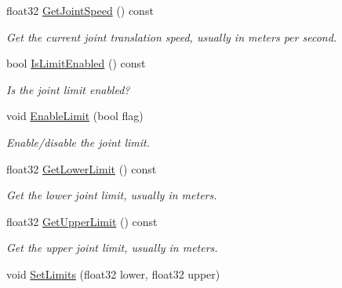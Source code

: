 \begin{DoxyCompactItemize}
float32 \hyperlink{classb2PrismaticJoint_af407d14ac024abdee49b852613f1bbc2}{Get\+Joint\+Speed} () const
\begin{DoxyCompactList}\small\item\em Get the current joint translation speed, usually in meters per second. \end{DoxyCompactList}\item 
\mbox{\label{classb2PrismaticJoint_a22e2442a17832f718447c63c9c6263c8}} 
bool \hyperlink{classb2PrismaticJoint_a22e2442a17832f718447c63c9c6263c8}{Is\+Limit\+Enabled} () const
\begin{DoxyCompactList}\small\item\em Is the joint limit enabled? \end{DoxyCompactList}\item 
\mbox{\label{classb2PrismaticJoint_a6d419afe7bd4b0e36d2e4607df7f79f2}} 
void \hyperlink{classb2PrismaticJoint_a6d419afe7bd4b0e36d2e4607df7f79f2}{Enable\+Limit} (bool flag)
\begin{DoxyCompactList}\small\item\em Enable/disable the joint limit. \end{DoxyCompactList}\item 
\mbox{\label{classb2PrismaticJoint_a10a2d3c03164190d279fa3c72eafb49e}} 
float32 \hyperlink{classb2PrismaticJoint_a10a2d3c03164190d279fa3c72eafb49e}{Get\+Lower\+Limit} () const
\begin{DoxyCompactList}\small\item\em Get the lower joint limit, usually in meters. \end{DoxyCompactList}\item 
\mbox{\label{classb2PrismaticJoint_aabae1da55e500b9c77007de4d085ffda}} 
float32 \hyperlink{classb2PrismaticJoint_aabae1da55e500b9c77007de4d085ffda}{Get\+Upper\+Limit} () const
\begin{DoxyCompactList}\small\item\em Get the upper joint limit, usually in meters. \end{DoxyCompactList}\item 
\mbox{\label{classb2PrismaticJoint_a82a220e6d5a212c1924882e0855b0bef}} 
void \hyperlink{classb2PrismaticJoint_a82a220e6d5a212c1924882e0855b0bef}{Set\+Limits} (float32 lower, float32 upper)

\end{DoxyCompactItemize}
